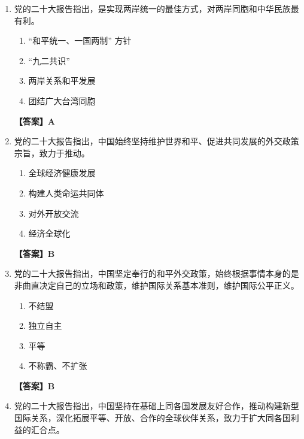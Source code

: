 \documentclass[UTF8,11pt,a4paper]{ctexart}
\begin{document}
\begin{enumerate}[label=\textbf{\arabic*.}, leftmargin=2.5em, itemsep=0.7em]
\begin{enumerate}[label=\Alph*., leftmargin=2em, itemsep=0.1em, topsep=0.15em]
\item 社会主义现代化强国
\item “一国两制”
\item 两岸繁荣发展
\item 中华民族伟大复兴
\end{enumerate}
\textbf{【答案】D}
\item 党的二十大报告指出，\allowbreak\underline{\hspace{4em}}是实现两岸统一的最佳方式，对两岸同胞和中华民族最有利。
\begin{enumerate}[label=\Alph*., leftmargin=2em, itemsep=0.1em, topsep=0.15em]
\item “和平统一、一国两制” 方针
\item “九二共识”
\item 两岸关系和平发展
\item 团结广大台湾同胞
\end{enumerate}
\textbf{【答案】A}
\item 党的二十大报告指出，中国始终坚持维护世界和平、促进共同发展的外交政策宗旨，致力于推动\allowbreak\underline{\hspace{4em}}。
\begin{enumerate}[label=\Alph*., leftmargin=2em, itemsep=0.1em, topsep=0.15em]
\item 全球经济健康发展
\item 构建人类命运共同体
\item 对外开放交流
\item 经济全球化
\end{enumerate}
\textbf{【答案】B}
\item 党的二十大报告指出，中国坚定奉行\allowbreak\underline{\hspace{4em}}的和平外交政策，始终根据事情本身的是非曲直决定自己的立场和政策，维护国际关系基本准则，维护国际公平正义。
\begin{enumerate}[label=\Alph*., leftmargin=2em, itemsep=0.1em, topsep=0.15em]
\item 不结盟
\item 独立自主
\item 平等
\item 不称霸、不扩张
\end{enumerate}
\textbf{【答案】B}
\item 党的二十大报告指出，中国坚持在\allowbreak\underline{\hspace{4em}}基础上同各国发展友好合作，推动构建新型国际关系，深化拓展平等、开放、合作的全球伙伴关系，致力于扩大同各国利益的汇合点。
\begin{enumerate}[label=\Alph*., leftmargin=2em, itemsep=0.1em, topsep=0.15em]

\end{enumerate}
\end{enumerate}
\end{document}
